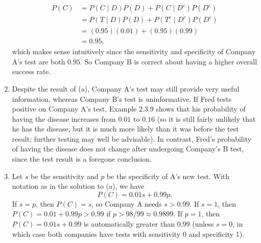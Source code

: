 \begin{exercise}[BH.2.9]
\begin{solution}
\begin{enumerate}
$$\begin{aligned}
				P(C) &=P(C \mid D) P(D)+P\left(C \mid D^c\right) P\left(D^c\right) \\
				&=P(T \mid D) P(D)+P\left(T^c \mid D^c\right) P\left(D^c\right) \\
				&=(0.95)(0.01)+(0.95)(0.99) \\
				&=0.95,
			\end{aligned}
			$$
			which makes sense intuitively since the sensitivity and specificity of Company A's test are both $0.95$. So Company B is correct about having a higher overall success rate.
			\item  Despite the result of (a), Company A's test may still provide very useful information, whereas Company B's test is uninformative. If Fred tests positive on Company A's test, Example 2.3.9 shows that his probability of having the disease increases from $0.01$ to $0.16$ (so it is still fairly unlikely that he has the disease, but it is much more likely than it was before the test result; further testing may well be advisable). In contrast, Fred's probability of having the disease does not change after undergoing Company's B test, since the test result is a foregone conclusion.
			\item Let $s$ be the sensitivity and $p$ be the specificity of A's new test. With notation as in the solution to (a), we have
			$$
			P(C)=0.01 s+0.99 p .
			$$
			If $s=p$, then $P(C)=s$, so Company A needs $s>0.99$.
			If $s=1$, then $P(C)=0.01+0.99 p>0.99$ if $p>98 / 99 \approx 0.9899$.
			If $p=1$, then $P(C)=0.01 s+0.99$ is automatically greater than $0.99$ (unless $s=0$, in which case both companies have tests with sensitivity 0 and specificity 1).
		\end{enumerate}
	\end{solution}
\end{exercise}


